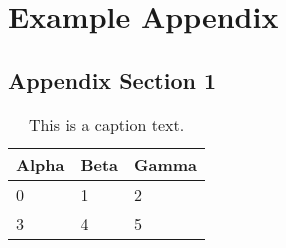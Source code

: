 %
\chapter{Example Appendix}
\label{sec:appendix}


\section{Appendix Section 1}
\label{sec:appendix:sec1}

\begin{table}[h]
	\begin{tabularx}{\textwidth}{X | X | X}
		Alpha		& Beta			& Gamma			\\ \hline
		0			& 1				& 2				\\ \hline
		3			& 4				& 5				\\ %
	\end{tabularx}
	\label{tab:table1}
	\caption{This is a caption text.}
\end{table}
